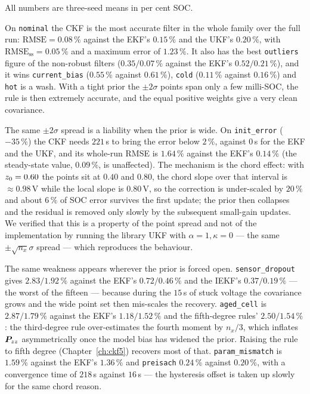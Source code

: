 All numbers are three-seed means in per cent SOC.

On \texttt{nominal} the CKF is the most accurate filter in the whole family over the full run:
$\text{RMSE} = 0.08\,\%$ against the EKF's $0.15\,\%$ and the UKF's $0.20\,\%$, with
$\text{RMSE}_{\text{ss}} = 0.05\,\%$ and a maximum error of $1.23\,\%$. It also has the best
\texttt{outliers} figure of the non-robust filters ($0.35/0.07\,\%$ against the EKF's
$0.52/0.21\,\%$), and it wins \texttt{current\_bias} ($0.55\,\%$ against $0.61\,\%$),
\texttt{cold} ($0.11\,\%$ against $0.16\,\%$) and \texttt{hot} is a wash. With a tight prior
the $\pm2\sigma$ points span only a few milli-SOC, the rule is then extremely accurate, and the
equal positive weights give a very clean covariance.

The same $\pm2\sigma$ spread is a liability when the prior is wide. On \texttt{init\_error}
($-35\,\%$) the CKF needs $221$\,s to bring the error below $2\,\%$, against $0$\,s for the EKF
and the UKF, and its whole-run RMSE is $1.64\,\%$ against the EKF's $0.14\,\%$ (the
steady-state value, $0.09\,\%$, is unaffected). The mechanism is the chord effect: with
$z_0 = 0.60$ the points sit at $0.40$ and $0.80$, the chord slope over that interval is
$\approx 0.98$\,V while the local slope is $0.80$\,V, so the correction is under-scaled by
$20\,\%$ and about $6\,\%$ of SOC error survives the first update; the prior then collapses and
the residual is removed only slowly by the subsequent small-gain updates. We verified that this
is a property of the point spread and not of the implementation by running the library UKF with
$\alpha = 1,\kappa = 0$ --- the same $\pm\sqrt{n_x}\sigma$ spread --- which reproduces the
behaviour.

The same weakness appears wherever the prior is forced open. \texttt{sensor\_dropout} gives
$2.83/1.92\,\%$ against the EKF's $0.72/0.46\,\%$ and the IEKF's $0.37/0.19\,\%$ --- the worst
of the fifteen --- because during the $15$\,s of stuck voltage the covariance grows and the
wide point set then mis-scales the recovery. \texttt{aged\_cell} is $2.87/1.79\,\%$ against the
EKF's $1.18/1.52\,\%$ and the fifth-degree rules' $2.50/1.54\,\%$: the third-degree rule
over-estimates the fourth moment by $n_x/3$, which inflates $\bm{P}_{zz}$ asymmetrically once the
model bias has widened the prior. Raising the rule to fifth degree
(Chapter~\ref{ch:ckf5}) recovers most of that. \texttt{param\_mismatch} is $1.59\,\%$ against
the EKF's $1.36\,\%$ and \texttt{preisach} $0.24\,\%$ against $0.20\,\%$, with a convergence
time of $218$\,s against $16$\,s --- the hysteresis offset is taken up slowly for the same
chord reason.


